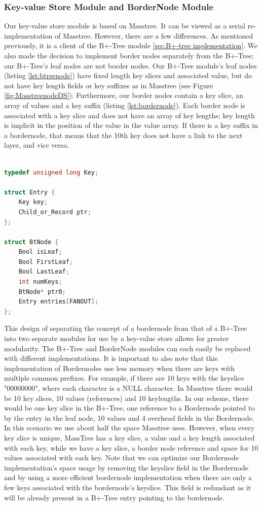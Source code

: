 \subsubsection{Key-value Store Module and BorderNode Module}

Our key-value store module is based on Masstree. It can be viewed as a serial re-implementation of Masstree. However, there are a few differences. As mentioned previously, it is a client of the B+-Tree module \ref{sec:B+-tree implementation}. We also made the decision to implement border nodes separately from the B+-Tree; our B+-Tree's leaf nodes are not border nodes. Our B+-Tree module's leaf nodes (listing \ref{lst:btreenode}) have fixed length key slices and associated value, but do not have key length fields or key suffixes as in Masstree (see Figure \ref{fig:MasstreenodeDS}). Furthermore, our border nodes contain a key slice, an array of values and a key suffix (listing \ref{lst:bordernode}). Each border node is associated with a key slice and does not have an array of key lengths; key length is implicit in the position of the value in the value array. If there is a key suffix in a bordernode, that means that the 10th key does not have a link to the next layer, and vice versa. 


\begin{lstlisting}[language=C, caption={B+-Tree node type definition}, captionpos=b, label = {lst:btreenode}]

typedef unsigned long Key;

struct Entry {
    Key key;
    Child_or_Record ptr;
};

struct BtNode {
    Bool isLeaf;
    Bool FirstLeaf;
    Bool LastLeaf;
    int numKeys;
    BtNode* ptr0;
    Entry entries[FANOUT];
};
\end{lstlisting}

This design of separating the concept of a bordernode from that of a B+-Tree into two separate modules for use by a key-value store allows for greater modularity. The B+-Tree and BorderNode modules can each easily be replaced with different implementations. It is important to also note that this implementation of Bordernodes use less memory when there are keys with multiple common prefixes. For example, if there are 10 keys with the keyslice "00000000", where each character is a NULL character. In Masstree there would be 10 key slices, 10 values (references) and 10 keylengths. In our scheme, there would be one key slice in the B+-Tree, one reference to a Bordernode pointed to by the entry in the leaf node, 10 values and 4 overhead fields in the Bordernode. In this scenario we use about half the space Masstree uses. However, when every key slice is unique, MassTree has a key slice, a value and a key length associated with each key, while we have a key slice, a border node reference and space for 10 values associated with each key. Note that we can optimize our Bordernode implementation's space usage by removing the keyslice field in the Bordernode and by using a more efficient bordernode implementation when there are only a few keys associated with the bordernode's keyslice. This field is redundant as it will be already present in a B+-Tree entry pointing to the bordernode. 

